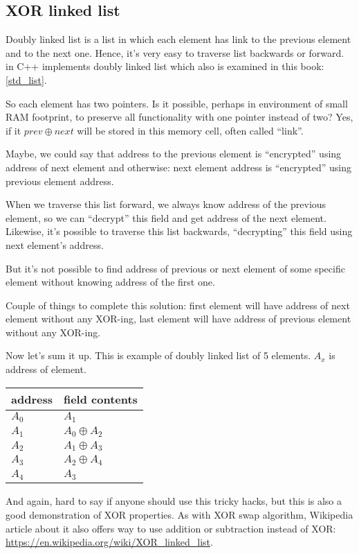 \subsection{XOR linked list}

Doubly linked list is a list in which each element has link to the previous element and to the next one.
Hence, it's very easy to traverse list backwards or forward.
 in C++ implements doubly linked list which also is examined in this book: \ref{std_list}.

So each element has two pointers.
Is it possible, perhaps in environment of small \ac{RAM} footprint, to preserve all functionality with one pointer instead of two?
Yes, if it $prev \oplus next$ will be stored in this memory cell, often called ``link''.

Maybe, we could say that address to the previous element is ``encrypted'' using address of next element and otherwise:
next element address is ``encrypted'' using previous element address.

When we traverse this list forward, we always know address of the previous element, so we can ``decrypt'' this field and get 
address of the next element.
Likewise, it's possible to traverse this list backwards, ``decrypting'' this field using next element's address.

But it's not possible to find address of previous or next element of some specific element without
knowing address of the first one.

Couple of things to complete this solution: first element will have address of next element without any XOR-ing,
last element will have address of previous element without any XOR-ing.

Now let's sum it up. This is example of doubly linked list of 5 elements.
$A_x$ is address of element.

\begin{center}
\begin{tabular}{ | l | l | }
	\hline
	\HeaderColor address & \HeaderColor \IT{link} field contents \\
	\hline
	$A_0$ & $A_1$ \\
	\hline
	$A_1$ & $A_0 \oplus A_2$ \\
	\hline
	$A_2$ & $A_1 \oplus A_3$ \\
	\hline
	$A_3$ & $A_2 \oplus A_4$ \\
	\hline
	$A_4$ & $A_3$ \\
	\hline
\end{tabular}
\end{center}

And again, hard to say if anyone should use this tricky hacks, but this is also a good demonstration of XOR properties.
As with XOR swap algorithm, Wikipedia article about it also offers way to use addition or subtraction instead of XOR:
\url{https://en.wikipedia.org/wiki/XOR_linked_list}.

